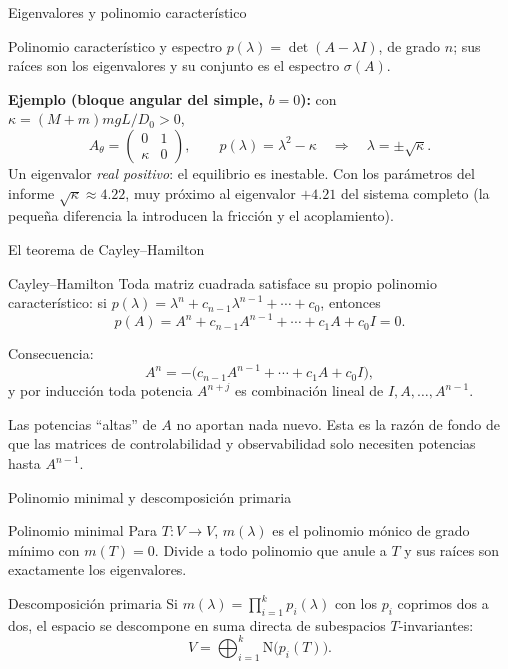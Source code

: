 \documentclass[aspectratio=169,11pt]{beamer}
\begin{document}
\begin{frame}{Eigenvalores y polinomio característico}
  \begin{cajadef}{Polinomio caracter\'istico y espectro}
    $p(\lambda)=\det(A-\lambda I)$, de grado $n$; sus ra\'ices son los
    eigenvalores y su conjunto es el espectro $\sigma(A)$.
  \end{cajadef}
  \textbf{Ejemplo (bloque angular del simple, $b=0$):} con
  $\kappa=(M{+}m)mgL/D_0>0$,
  \[
    A_\theta=\begin{pmatrix}0&1\\\kappa&0\end{pmatrix},
    \qquad
    p(\lambda)=\lambda^2-\kappa
    \quad\Longrightarrow\quad
    \lambda=\pm\sqrt{\kappa}.
  \]
  \small Un eigenvalor \emph{real positivo}: el equilibrio es inestable. Con los
  par\'ametros del informe $\sqrt{\kappa}\approx 4.22$, muy pr\'oximo al
  eigenvalor $+4.21$ del sistema completo (la peque\~na diferencia la introducen
  la fricci\'on y el acoplamiento).
\end{frame}

\begin{frame}{El teorema de Cayley--Hamilton}
  \begin{cajateo}{Cayley--Hamilton}
    Toda matriz cuadrada satisface su propio polinomio caracter\'istico:
    si $p(\lambda)=\lambda^n+c_{n-1}\lambda^{n-1}+\cdots+c_0$, entonces
    \[
      p(A)=A^n+c_{n-1}A^{n-1}+\cdots+c_1A+c_0I=0 .
    \]
  \end{cajateo}
  Consecuencia:
  \[
    A^n=-\bigl(c_{n-1}A^{n-1}+\cdots+c_1A+c_0I\bigr),
  \]
  y por inducci\'on toda potencia $A^{n+j}$ es combinaci\'on lineal de
  $I,A,\dots,A^{n-1}$.
  \begin{cajaclave}
    \small Las potencias ``altas'' de $A$ no aportan nada nuevo. Esta es la
    raz\'on de fondo de que las matrices de controlabilidad y observabilidad
    solo necesiten potencias hasta $A^{n-1}$.
  \end{cajaclave}
\end{frame}

\begin{frame}{Polinomio minimal y descomposición primaria}
  \begin{cajadef}{Polinomio minimal}
    Para $T:V\to V$, $m(\lambda)$ es el polinomio m\'onico de grado m\'inimo con
    $m(T)=0$. Divide a todo polinomio que anule a $T$ y sus ra\'ices son
    exactamente los eigenvalores.
  \end{cajadef}
  \begin{cajateo}{Descomposici\'on primaria}
    Si $m(\lambda)=\prod_{i=1}^{k}p_i(\lambda)$ con los $p_i$ coprimos dos a
    dos, el espacio se descompone en suma directa de subespacios
    $T$-invariantes:
    \[
      V=\bigoplus_{i=1}^{k}\mathrm{N}\!\bigl(p_i(T)\bigr).
    \]
  \end{cajateo}
\end{frame}
\end{document}
